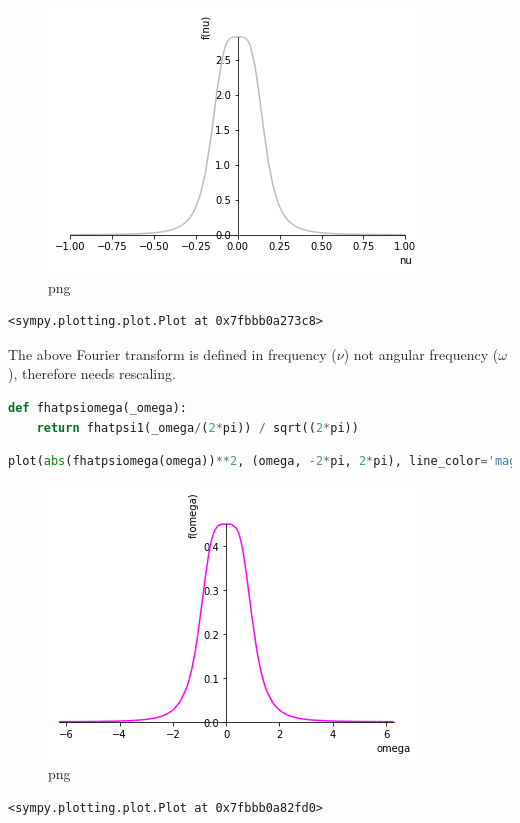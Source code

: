 \begin{figure}
\centering
\includegraphics[width=0.66\linewidth]{output_56_0.png}
\caption[]{png}
\end{figure}

\begin{lstlisting}
<sympy.plotting.plot.Plot at 0x7fbbb0a273c8>
\end{lstlisting}

The above Fourier transform is defined in frequency ($\nu$) not angular
frequency ($\omega$), therefore needs rescaling.

\begin{lstlisting}[language=Python]
def fhatpsiomega(_omega):
    return fhatpsi1(_omega/(2*pi)) / sqrt((2*pi))
\end{lstlisting}

\begin{lstlisting}[language=Python]
plot(abs(fhatpsiomega(omega))**2, (omega, -2*pi, 2*pi), line_color='magenta')
\end{lstlisting}

\begin{figure}
\centering
\includegraphics[width=0.66\linewidth]{output_59_0.png}
\caption[]{png}
\end{figure}

\begin{lstlisting}
<sympy.plotting.plot.Plot at 0x7fbbb0a82fd0>
\end{lstlisting}

